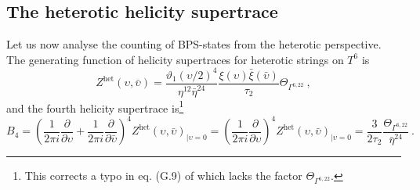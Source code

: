\documentclass[a4paper,11pt]{article}
\numberwithin{equation}{section}
\def\be{\begin{equation}}
\def\ee{\end{equation}}
\begin{document}
\subsection{The heterotic helicity supertrace}

Let us now analyse the counting of BPS-states from the heterotic perspective. The generating function of helicity supertraces for heterotic strings on $T^6$ is \cite{Kiritsis:1997hj}
\be Z^{\text{het}}(\upsilon,\bar\upsilon)=
\frac{\vartheta_1(\upsilon/2)^4  }{\eta^{12}\bar\eta^{24}}\frac{\xi(\upsilon)\bar\xi(\bar\upsilon)}{\tau_2}\Theta_{\Gamma^{6,22}}\ ,
\ee and the fourth helicity supertrace is\footnote{This corrects a typo in eq. (G.9) of \cite{Kiritsis:1997hj} which lacks the factor $\Theta_{\Gamma^{6,22}}$.}
\be B_4=\left(\frac{1}{2\pi i} \frac{\partial}{\partial \upsilon}+\frac{1}{2\pi i} \frac{\partial}{\partial \bar\upsilon}\right)^4 Z^{\text{het}}(\upsilon,\bar \upsilon)_{\rvert \upsilon=0}=\left(\frac{1}{2\pi i} \frac{\partial}{\partial \upsilon}\right)^4Z^{\text{het}}(\upsilon,\bar \upsilon)_{\rvert \upsilon=0}=\frac{3}{2\tau_2} \frac{\Theta_{\Gamma^{6,22}}}{\bar\eta^{24}}\ .
\ee 
\end{document}
